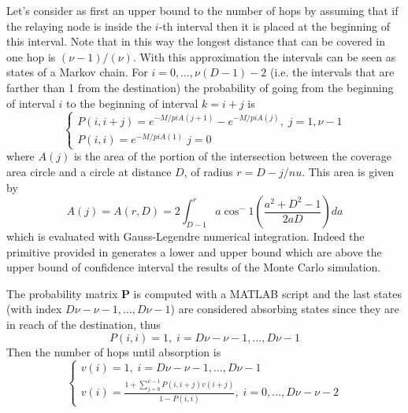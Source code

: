 \documentclass[10pt]{article}
\begin{document}
Let's consider as first an upper bound to the number of hops by assuming that if the relaying node is inside the $i$-th interval then it is placed at the beginning of this interval. Note that in this way the longest distance that can be covered in one hop is $(\nu - 1) / (\nu)$. With this approximation the intervals can be seen as states of a Markov chain. For $i = 0, \dots, \nu (D - 1) - 2$ (i.e. the intervals that are farther than 1 from the destination) the probability of going from the beginning of interval $i$ to the beginning of interval $k = i + j$ is 
\begin{equation}
\begin{cases}
  P(i, i + j) = e^{-M/pi A(j+1)} - e^{-M/pi A(j)}, \; j = 1, \nu-1 \\
  P(i, i) = e^{-M/pi A(1)} \; j = 0
\end{cases}
\end{equation}
where $A(j)$ is the area of the portion of the intersection between the coverage area circle and a circle at distance $D$, of radius $r = D - j/nu$. This area is given by
\begin{equation}
  A(j) = A(r, D) = 2\int_{D-1}^r a \cos^-1 \left( \frac{a^2 + D^2 - 1}{2aD} \right) da
\end{equation}
which is evaluated with Gauss-Legendre numerical integration. Indeed the primitive provided in \cite{tmc} generates a lower and upper bound which are above the upper bound of confidence interval the results of the Monte Carlo simulation. 

The probability matrix $\mathbf{P}$ is computed with a MATLAB script and the last states (with index $D\nu - \nu - 1, \dots, D\nu -1 $) are considered absorbing states since they are in reach of the destination, thus
\begin{equation}
  P(i, i) = 1, \; i = D\nu - \nu - 1, \dots, D\nu -1 
\end{equation} 
Then the number of hops until absorption is 
\begin{equation}
\begin{cases}
  v(i) = 1, \; i = D\nu - \nu - 1, \dots, D\nu -1  \\
  v(i) = \frac{1+\sum_{j = 0}^{\nu - 1} P(i, i + j) v(i + j)}{1-P(i, i)}, \; i = 0, \dots, D\nu - \nu - 2
\end{cases}
\end{equation}
\end{document}
